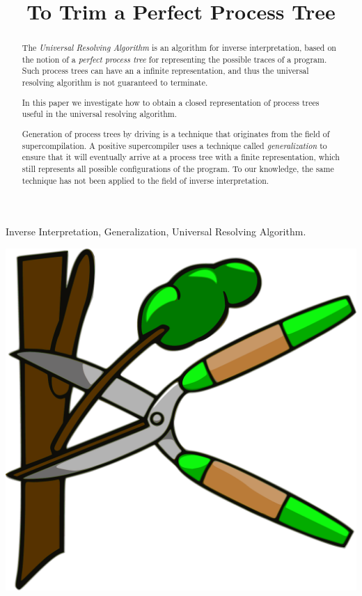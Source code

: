 \documentclass[10pt]{../sigplanconf}
\title{To Trim a Perfect Process Tree}
\begin{document}
\maketitle

\begin{abstract}
  The \textit{Universal Resolving
    Algorithm}\cite{abramov2000universal} is an algorithm for inverse
  interpretation, based on the notion of a \textit{perfect process
    tree} \cite{gluck1993occam} for representing the possible traces
  of a program. Such process trees can have an a infinite
  representation, and thus the universal resolving algorithm is not
  guaranteed to terminate.

  In this paper we investigate how to obtain a closed representation
  of process trees useful in the universal resolving algorithm.

  Generation of process trees by driving is a technique that
  originates from the field of
  supercompilation\cite{sorensen1998introduction}. A positive
  supercompiler uses a technique called \emph{generalization} to
  ensure that it will eventually arrive at a process tree with a
  finite representation, which still represents all possible
  configurations of the program. To our knowledge, the same technique
  has not been applied to the field of inverse interpretation.
\end{abstract}

\keywords Inverse Interpretation, Generalization, Universal Resolving
Algorithm.
\begin{center}
  \vspace{0.5cm}
  \includegraphics[width=0.6\columnwidth]{../figures/pruning.pdf}
  \vspace{0.5cm}
\end{center}
\end{document}
